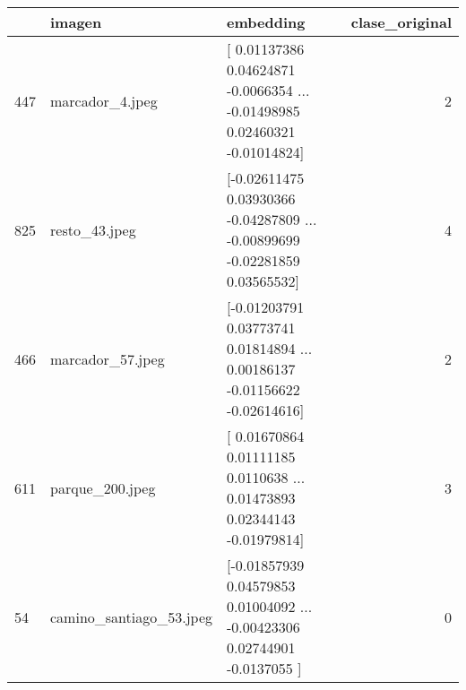 \begin{tabular}{lllr}
\toprule
 & imagen & embedding & clase\_original \\
\midrule
447 & marcador\_4.jpeg & [ 0.01137386  0.04624871 -0.0066354  ... -0.01498985  0.02460321
 -0.01014824] & 2 \\
825 & resto\_43.jpeg & [-0.02611475  0.03930366 -0.04287809 ... -0.00899699 -0.02281859
  0.03565532] & 4 \\
466 & marcador\_57.jpeg & [-0.01203791  0.03773741  0.01814894 ...  0.00186137 -0.01156622
 -0.02614616] & 2 \\
611 & parque\_200.jpeg & [ 0.01670864  0.01111185  0.0110638  ...  0.01473893  0.02344143
 -0.01979814] & 3 \\
54 & camino\_santiago\_53.jpeg & [-0.01857939  0.04579853  0.01004092 ... -0.00423306  0.02744901
 -0.0137055 ] & 0 \\
\bottomrule
\end{tabular}
